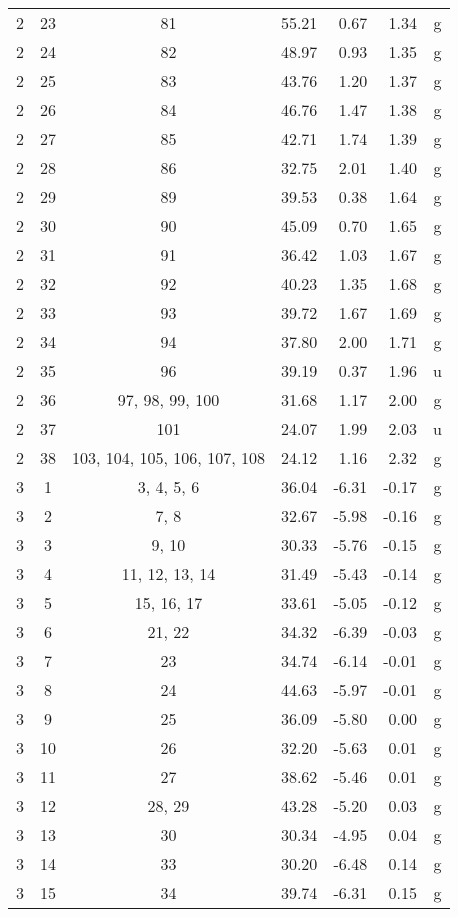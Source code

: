 \begin{center}
\begin{longtable}{cccrrrc}
  2 & 23 & 81 & 55.21 &  0.67 &  1.34 & g\\
  2 & 24 & 82 & 48.97 &  0.93 &  1.35 & g\\
  2 & 25 & 83 & 43.76 &  1.20 &  1.37 & g\\
  2 & 26 & 84 & 46.76 &  1.47 &  1.38 & g\\
  2 & 27 & 85 & 42.71 &  1.74 &  1.39 & g\\
  2 & 28 & 86 & 32.75 &  2.01 &  1.40 & g\\
  2 & 29 & 89 & 39.53 &  0.38 &  1.64 & g\\
  2 & 30 & 90 & 45.09 &  0.70 &  1.65 & g\\
  2 & 31 & 91 & 36.42 &  1.03 &  1.67 & g\\
  2 & 32 & 92 & 40.23 &  1.35 &  1.68 & g\\
  2 & 33 & 93 & 39.72 &  1.67 &  1.69 & g\\
  2 & 34 & 94 & 37.80 &  2.00 &  1.71 & g\\
  2 & 35 & 96 & 39.19 &  0.37 &  1.96 & u\\
  2 & 36 & 97, 98, 99, 100 & 31.68 &  1.17 &  2.00 & g\\
  2 & 37 & 101 & 24.07 &  1.99 &  2.03 & u\\
  2 & 38 & 103, 104, 105, 106, 107, 108 & 24.12 &  1.16 &  2.32 & g\\
  3 & 1 & 3, 4, 5, 6 & 36.04 & -6.31 & -0.17 & g\\
  3 & 2 & 7, 8 & 32.67 & -5.98 & -0.16 & g\\
  3 & 3 & 9, 10 & 30.33 & -5.76 & -0.15 & g\\
  3 & 4 & 11, 12, 13, 14 & 31.49 & -5.43 & -0.14 & g\\
  3 & 5 & 15, 16, 17 & 33.61 & -5.05 & -0.12 & g\\
  3 & 6 & 21, 22 & 34.32 & -6.39 & -0.03 & g\\
  3 & 7 & 23 & 34.74 & -6.14 & -0.01 & g\\
  3 & 8 & 24 & 44.63 & -5.97 & -0.01 & g\\
  3 & 9 & 25 & 36.09 & -5.80 &  0.00 & g\\
  3 & 10 & 26 & 32.20 & -5.63 &  0.01 & g\\
  3 & 11 & 27 & 38.62 & -5.46 &  0.01 & g\\
  3 & 12 & 28, 29 & 43.28 & -5.20 &  0.03 & g\\
  3 & 13 & 30 & 30.34 & -4.95 &  0.04 & g\\
  3 & 14 & 33 & 30.20 & -6.48 &  0.14 & g\\
  3 & 15 & 34 & 39.74 & -6.31 &  0.15 & g\\

\end{longtable}
\end{center}
